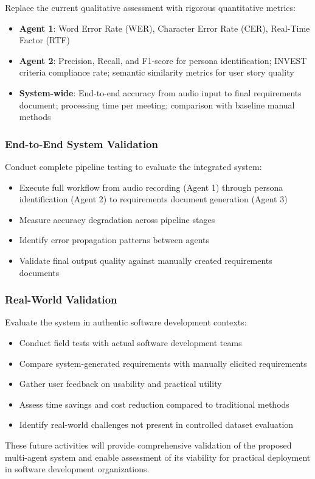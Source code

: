 \documentclass[12pt]{article}
\begin{document}
Replace the current qualitative assessment with rigorous quantitative metrics:

\begin{itemize}
    \item \textbf{Agent 1}: Word Error Rate (WER), Character Error Rate (CER), Real-Time Factor (RTF)
    \item \textbf{Agent 2}: Precision, Recall, and F1-score for persona identification; INVEST criteria compliance rate; semantic similarity metrics for user story quality
    \item \textbf{System-wide}: End-to-end accuracy from audio input to final requirements document; processing time per meeting; comparison with baseline manual methods
\end{itemize}

\subsubsection{End-to-End System Validation}

Conduct complete pipeline testing to evaluate the integrated system:

\begin{itemize}
    \item Execute full workflow from audio recording (Agent 1) through persona identification (Agent 2) to requirements document generation (Agent 3)
    \item Measure accuracy degradation across pipeline stages
    \item Identify error propagation patterns between agents
    \item Validate final output quality against manually created requirements documents
\end{itemize}

\subsubsection{Real-World Validation}

Evaluate the system in authentic software development contexts:

\begin{itemize}
    \item Conduct field tests with actual software development teams
    \item Compare system-generated requirements with manually elicited requirements
    \item Gather user feedback on usability and practical utility
    \item Assess time savings and cost reduction compared to traditional methods
    \item Identify real-world challenges not present in controlled dataset evaluation
\end{itemize}

These future activities will provide comprehensive validation of the proposed multi-agent system and enable assessment of its viability for practical deployment in software development organizations.




\end{document}
